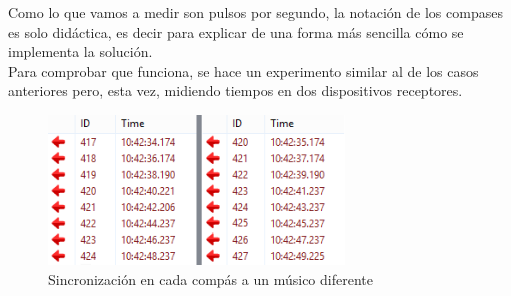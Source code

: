 Como lo que vamos a medir son pulsos por segundo, la notación de los compases es solo didáctica, es decir
para explicar de una forma más sencilla cómo se implementa la solución.\\

Para comprobar que funciona, se hace un experimento similar al de los casos anteriores pero,
esta vez, midiendo tiempos en dos dispositivos receptores.

\begin{figure}[!htb]
\centering
\includegraphics[width=0.7\textwidth]{./imagenes/sincronizacion}
\caption{Sincronización en cada compás a un músico diferente} \label{fig:sincronizacion}
\end{figure}



